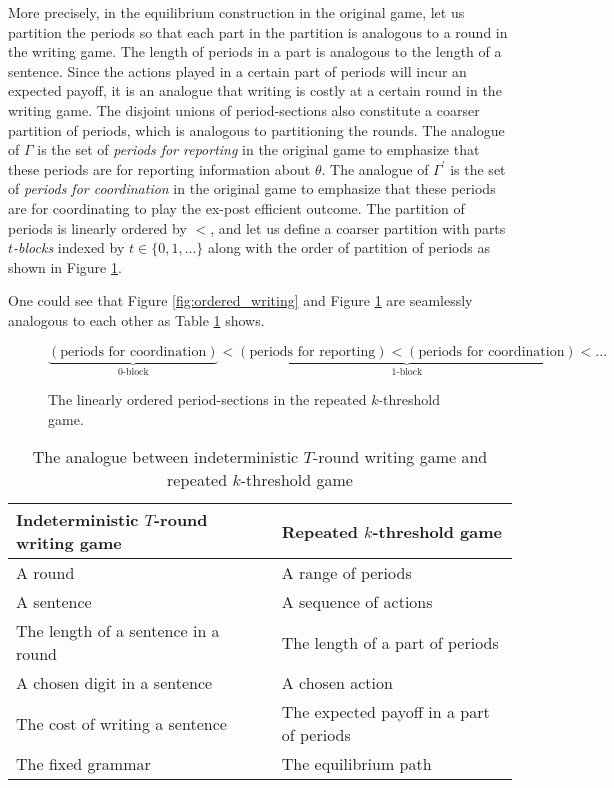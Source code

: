\documentclass[12pt,letter]{article}
\theoremstyle{definition}
\theoremstyle{remark}
\theoremstyle{claim}
\begin{document}
More precisely, in the equilibrium construction in the original game, let us partition the periods so that each part in the partition is analogous to a round in the writing game. The length of periods in a part is analogous to the length of a sentence. Since the actions played in a certain part of periods will incur an expected payoff, it is an analogue that writing is costly at a certain round in the writing game. The disjoint unions of period-sections also constitute a coarser partition of periods, which is analogous to partitioning the rounds. The analogue of $\Gamma$ is the set of \textit{periods for reporting} in the original game to emphasize that these periods are for reporting information about $\theta$. The analogue of $\Gamma^{'}$ is the set of \textit{periods for coordination} in the original game to emphasize that these periods are for coordinating to play the ex-post efficient outcome. The partition of periods is linearly ordered by $<$, and let us define a coarser partition with parts \textit{$t$-blocks} indexed by $t\in\{0,1,...\}$ along with the order of partition of periods as shown in Figure \ref{fig:ordered_original_game}. 

One could see that Figure \ref{fig:ordered_writing} and Figure \ref{fig:ordered_original_game} are seamlessly analogous to each other as Table \ref{table:analogue} shows.

\begin{figure}
\caption{The linearly ordered period-sections in the repeated $k$-threshold game.}
\label{fig:ordered_original_game}
\[\underbrace{(\text{periods for coordination})}_{\text{$0$-block}}<\underbrace{(\text{periods for reporting})<(\text{periods for coordination})}_{\text{$1$-block}}<...\]

\end{figure}


\begin{table}[!htbp]
\caption{The analogue between indeterministic $T$-round writing game and repeated $k$-threshold game}
\label{table:analogue}
\begin{center}
\begin{tabular}{ll }
Indeterministic $T$-round writing game & Repeated $k$-threshold game \\
\hline
\hline
A round & A range of periods\\
A sentence & A sequence of actions \\
The length of a sentence in a round & The length of a part of periods\\
A chosen digit in a sentence & A chosen action\\
The cost of writing a sentence & The expected payoff in a part of periods\\
The fixed grammar & The equilibrium path\\
\hline
\end{tabular}
\end{center}

\end{table}
\end{document}

